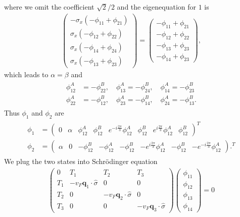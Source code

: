 \documentclass[10pt, oneside]{article}
\newcommand{\p}[1]{\left(#1\right)}
\begin{document}
where we omit the coefficient \(\sqrt{2}/2\) and the eigenequation for \(1\) is
\begin{align}
	\begin{pmatrix}
		-\sigma_{x} \p{ - \phi_{11} +  \phi_{21}} \\  \sigma_{x} \p{ - \phi_{12} + \phi_{22}} \\ \sigma_{x} \p{ - \phi_{14} + \phi_{24}} \\ \sigma_{x} \p{ - \phi_{13} + \phi_{23}}
	\end{pmatrix} = \begin{pmatrix}
		 - \phi_{11} + \phi_{21} \\  - \phi_{12} + \phi_{22} \\  - \phi_{13} + \phi_{23} \\ - \phi_{14} + \phi_{23}
	\end{pmatrix},
\end{align}
which leads to \(\alpha = \beta\) and 
\begin{align}
	\begin{split}
		\phi_{12}^{A} &= - \phi_{22}^{B}, \quad \phi_{13}^{A} = - \phi_{24}^{B}, \quad \phi_{14}^{A} = - \phi_{23}^{B} \\ 
		\phi_{22}^{A} &= - \phi_{12}^{B}, \quad \phi_{23}^{A} = - \phi_{14}^{B}, \quad \phi_{24}^{A} = - \phi_{13}^{B}.
	\end{split}
\end{align}
Thus \(\phi_{1}\) and \(\phi_{2}\) are 
\begin{align}
	\begin{split}
		\phi_{1} &= \begin{pmatrix}
			0 & \alpha & \phi_{12}^{A} & \phi_{12}^{B} & e^{-i \frac{2 \pi}{3}} \phi_{12}^{A} & \phi_{12}^{B} & e^{i \frac{2 \pi}{3}} \phi_{12}^{A} & \phi_{12}^{B} 
		\end{pmatrix}^{T} \\
		\phi_{2} &= \begin{pmatrix}
			\alpha & 0 & - \phi_{12}^{B} & - \phi_{12}^{A} & - \phi_{12}^{B} & - e^{i \frac{2 \pi}{3}} \phi_{12}^{A} & - \phi_{12}^{B} & - e^{-i \frac{2 \pi}{3}} \phi_{12}^{A}
		\end{pmatrix}.^{T}
	\end{split}
\end{align}
We plug the two states into Schr\"odinger equation 
\begin{align}
	\begin{pmatrix}
		0 & T_1 & T_2 & T_3 \\
		T_{1} & - v_F\bm{q}_1 \cdot \hat{\sigma} & 0 & 0 \\
		T_2 & 0 & - v_F \bm{q}_{2} \cdot \hat{\sigma} & 0 \\
		T_3 & 0 & 0 & - v_F \bm{q}_{3} \cdot \hat{\sigma} 
	\end{pmatrix} \begin{pmatrix}
		\phi_{11} \\ \phi_{12} \\ \phi_{13} \\ \phi_{14}
	\end{pmatrix} = 0
\end{align}
\end{document}
